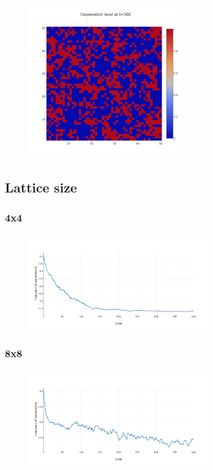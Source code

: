 \documentclass[11pt]{article}
\begin{document}
\begin{figure}[H]
\centering
   \includegraphics[width=0.6\textwidth]{img/part2/part2-moore-visu-300.png}
\end{figure}

\subsection{Lattice size}

\subsubsection{4x4}

\begin{figure}[H]
   \includegraphics[width=0.7\textwidth]{img/part2/part2-moore-4-4.png}
\end{figure}

\subsubsection{8x8}

\begin{figure}[H]
\centering
   \includegraphics[width=0.7\textwidth]{img/part2/part2-moore-8-8.png}
\end{figure}
\end{document}
